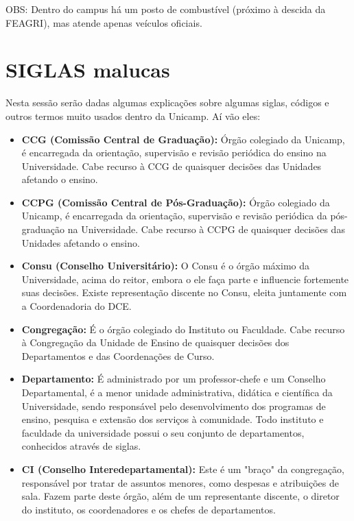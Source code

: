 OBS: Dentro do campus há um posto de combustível (próximo à descida da FEAGRI),
mas atende apenas veículos oficiais.

\twocolumn
\section{SIGLAS malucas}

Nesta sessão serão dadas algumas explicações sobre algumas siglas, códigos
e outros termos muito usados dentro da Unicamp. Aí vão eles:

\begin{itemize}
    \item  \textbf{CCG (Comissão Central de Graduação):} Órgão colegiado da
    Unicamp, é encarregada da orientação, supervisão e revisão periódica do
    ensino na Universidade. Cabe recurso à CCG de quaisquer decisões das
    Unidades afetando o ensino.

    \item  \textbf{CCPG (Comissão Central de Pós-Graduação):} Órgão colegiado da
    Unicamp, é encarregada da orientação, supervisão e revisão periódica da
    pós-graduação na Universidade. Cabe recurso à CCPG de quaisquer decisões das
    Unidades afetando o ensino.

    \item  \textbf{Consu (Conselho Universitário):} O Consu é o órgão máximo da
    Universidade, acima do reitor, embora o ele faça parte e influencie
    fortemente suas decisões.  Existe representação discente no Consu, eleita
    juntamente com a Coordenadoria do DCE.

    \item  \textbf{Congregação:} É o órgão colegiado do Instituto ou Faculdade.
    Cabe recurso à Congregação da Unidade de Ensino de quaisquer decisões dos
    Departamentos e das Coordenações de Curso.

    \item  \textbf{Departamento:} É administrado por um professor-chefe e um
    Conselho Departamental, é a menor unidade administrativa, didática
    e científica da Universidade, sendo responsável pelo desenvolvimento dos
    programas de ensino, pesquisa e extensão dos serviços à comunidade. Todo
    instituto e faculdade da universidade possui o seu conjunto de
    departamentos, conhecidos através de siglas.

    \item  \textbf{CI (Conselho Interedepartamental):} Este é um "braço" da
    congregação, responsável por tratar de assuntos menores, como despesas
    e atribuições de sala. Fazem parte deste órgão, além de um representante
    discente, o diretor do instituto, os coordenadores e os chefes de
    departamentos.


\end{itemize}
